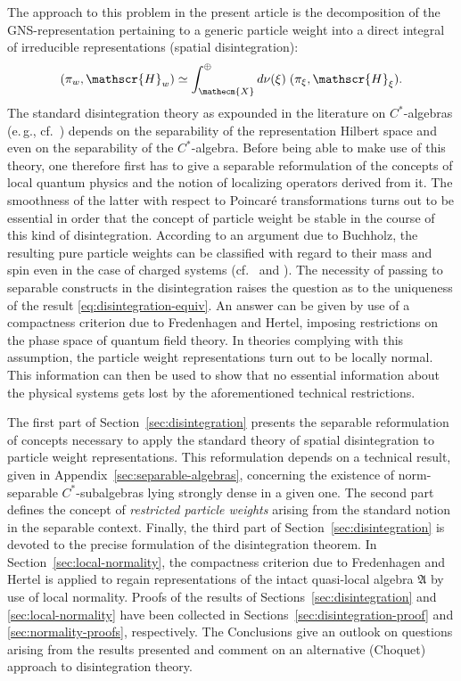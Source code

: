 \documentclass[a4paper,a4paper]{article}
\numberwithin{equation}{section}
\newcommand{\Xecm}{\mathecm{X}}
\newcommand{\Afrak}{\mathfrak{A}}
\newcommand{\Hscr}{\mathscr{H}}
\theoremstyle{definition}
\theoremstyle{plain}
\theoremstyle{remark}
\theoremstyle{assumption}
\begin{document}
  The approach to this problem in the present article is the
  decomposition of the GNS-representation pertaining to a generic
  particle weight into a direct integral of irreducible
  representations (spatial disintegration):
  \begin{equation}
    \label{eq:disintegration-equiv}
    ( \pi_w , \Hscr_w ) \simeq \int_\Xecm^\oplus d \nu ( \xi ) \; (
    \pi_\xi , \Hscr_\xi ) \text{.}
  \end{equation}
  The standard disintegration theory as expounded in the literature on
  $C^*$-algebras (e.\,g., cf.~\cite{dixmier:1982}) depends on the
  separability of the representation Hilbert space and even on the
  separability of the $C^*$-algebra. Before being able to make use of
  this theory, one therefore first has to give a separable
  reformulation of the concepts of local quantum physics and the
  notion of localizing operators derived from it. The smoothness of
  the latter with respect to Poincar\'e transformations turns out to
  be essential in order that the concept of particle weight be stable
  in the course of this kind of disintegration. According to an
  argument due to Buchholz, the resulting pure particle weights can be
  classified with regard to their mass and spin even in the case of
  charged systems (cf.~\cite{buchholz/porrmann/stein:1991} and
  \cite[Section~VI.2.2]{haag:1996}). The necessity of passing to
  separable constructs in the disintegration raises the question as to
  the uniqueness of the result \eqref{eq:disintegration-equiv}. An
  answer can be given by use of a compactness criterion due to
  Fredenhagen and Hertel, imposing restrictions on the phase space of
  quantum field theory. In theories complying with this assumption,
  the particle weight representations turn out to be locally normal.
  This information can then be used to show that no essential
  information about the physical systems gets lost by the
  aforementioned technical restrictions.
  
  The first part of Section~\ref{sec:disintegration} presents the
  separable reformulation of concepts necessary to apply the standard
  theory of spatial disintegration to particle weight representations.
  This reformulation depends on a technical result, given in
  Appendix~\ref{sec:separable-algebras}, concerning the existence of
  norm-separable $C^*$-subalgebras lying strongly dense in a given
  one. The second part defines the concept of \emph{restricted
    particle weights} arising from the standard notion in the
  separable context. Finally, the third part of
  Section~\ref{sec:disintegration} is devoted to the precise
  formulation of the disintegration theorem. In
  Section~\ref{sec:local-normality}, the compactness criterion due to
  Fredenhagen and Hertel is applied to regain representations of the
  intact quasi-local algebra $\Afrak$ by use of local normality.
  Proofs of the results of Sections~\ref{sec:disintegration} and
  \ref{sec:local-normality} have been collected in
  Sections~\ref{sec:disintegration-proof} and
  \ref{sec:normality-proofs}, respectively. The Conclusions give an
  outlook on questions arising from the results presented and comment
  on an alternative (Choquet) approach to disintegration theory.
\end{document}
